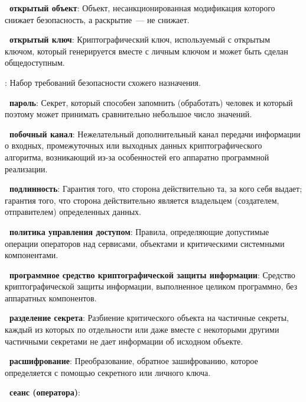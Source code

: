 {\bf \thedefctr~открытый объект}: 
Объект, несанкционированная модификация которого снижает безопасность, а
раскрытие~--- не снижает.

{\bf \thedefctr~открытый ключ}:
Криптографический ключ, используемый  
с открытым ключом, который генерируется вместе с личным ключом и может 
быть сделан общедоступным.


:
Набор требований безопасности схожего назначения.

{\bf \thedefctr~пароль}:
Секрет, который способен запомнить (обработать) человек и который
поэтому может принимать сравнительно небольшое число значений.

{\bf \thedefctr~побочный канал}:
Нежелательный дополнительный канал передачи информации о 
входных, промежуточных или выходных данных криптографического алгоритма,  
возникающий из-за особенностей его аппаратно программной 
реализации. 

{\bf \thedefctr~подлинность}:
Гарантия того, что сторона действительно та, за кого себя выдает; гарантия того,
что сторона действительно является владельцем (создателем, отправителем)
определенных данных.

{\bf \thedefctr~политика управления доступом}:
Правила, определяющие допустимые операции операторов над сервисами, объектами и
критическими системными компонентами.

{\bf \thedefctr~программное средство криптографической защиты информации}:
Средство криптографической защиты информации, выполненное целиком программно, 
без аппаратных компонентов. 

{\bf \thedefctr~разделение секрета}:
Разбиение критического объекта на частичные секреты, 
каждый из которых по отдельности или даже вместе с некоторыми
другими частичными секретами не дает информации об исходном объекте.

{\bf \thedefctr~расшифрование}:
Преобразование, обратное зашифрованию, которое определяется с помощью
секретного или личного ключа.

{\bf \thedefctr~сеанс (оператора)}:

